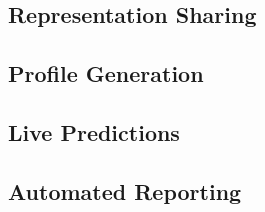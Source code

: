 \subsection{Representation Sharing}
\lorem
\subsection{Profile Generation}
\lorem
\subsection{Live Predictions}
\lorem
\subsection{Automated Reporting}
\lorem
